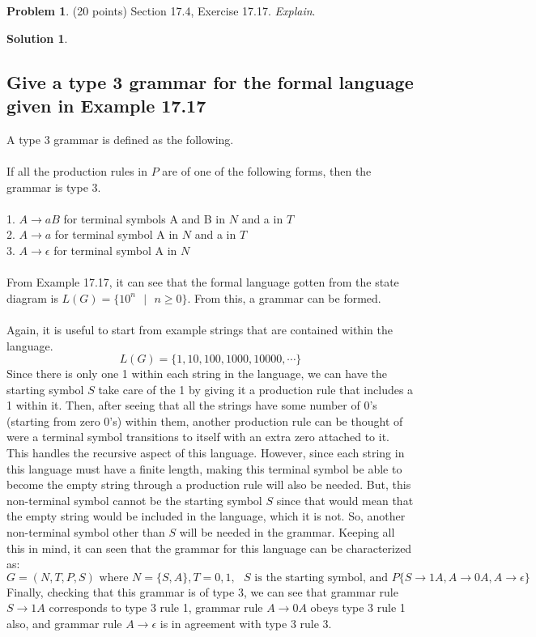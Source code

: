 \documentclass{article}
\theoremstyle{definition}
\newtheorem{problem}{Problem}
\newtheorem*{solution}{Solution}
\begin{document}
\newpage
\begin{problem} (20 points) Section 17.4, Exercise 17.17.  \textit{Explain}.
\end{problem}
\begin{solution}
\hspace{1cm}
\subsection*{Give a type 3 grammar for the formal language given in Example 17.17}
A type 3 grammar is defined as the following.\\\\
If all the production rules in $P$ are of one of the following forms, then the grammar is type 3.\\\\
1. $A \rightarrow aB$ for terminal symbols A and B in $N$ and a in $T$\\
2. $A \rightarrow a$ for terminal symbol A in $N$ and a in $T$\\
3. $A \rightarrow \epsilon$ for terminal symbol A in $N$\\\\
From Example 17.17, it can see that the formal language gotten from the state diagram is $L(G) = \{10^n \mbox{ } | \mbox{ } n \geqslant 0\}$. From this, a grammar can be formed.\\\\
Again, it is useful to start from example strings that are contained within the language.
$$ L(G) = \{1,10,100,1000,10000,\cdots \}$$
Since there is only one 1 within each string in the language, we can have the starting symbol $S$ take care of the 1 by giving it a production rule that includes a 1 within it. Then, after seeing that all the strings have some number of 0's (starting from zero 0's) within them, another production rule can be thought of were a terminal symbol transitions to itself with an extra zero attached to it. This handles the recursive aspect of this language. However, since each string in this language must have a finite length, making this terminal symbol be able to become the empty string through a production rule will also be needed. But, this non-terminal symbol cannot be the starting symbol $S$ since that would mean that the empty string would be included in the language, which it is not. So, another non-terminal symbol other than $S$ will be needed in the grammar. Keeping all this in mind, it can seen that the grammar for this language can be characterized as: 
$$ G = (N,T,P,S) \mbox{ where } N = \{S,A\}, T ={0,1}, \mbox{ $S$ is the starting symbol, and } P\{S \rightarrow 1A, A \rightarrow 0A, A \rightarrow \epsilon \} $$
Finally, checking that this grammar is of type 3, we can see that grammar rule $S \rightarrow 1A$ corresponds to type 3 rule 1, grammar rule $A \rightarrow 0A$ obeys type 3 rule 1 also, and grammar rule $A \rightarrow \epsilon$ is in agreement with type 3 rule 3.
\end{solution}
\end{document}
